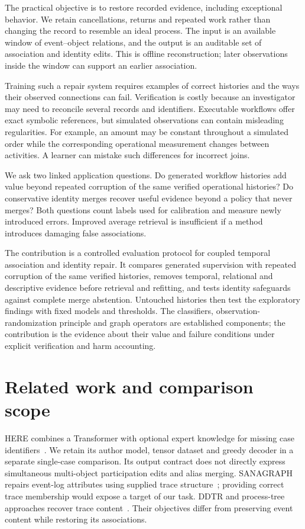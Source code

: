 \documentclass[11pt]{article}
\begin{document}
The practical objective is to restore recorded evidence, including exceptional behavior. We retain cancellations, returns and repeated work rather than changing the record to resemble an ideal process. The input is an available window of event--object relations, and the output is an auditable set of association and identity edits. This is offline reconstruction; later observations inside the window can support an earlier association.

Training such a repair system requires examples of correct histories and the ways their observed connections can fail. Verification is costly because an investigator may need to reconcile several records and identifiers. Executable workflows offer exact symbolic references, but simulated observations can contain misleading regularities. For example, an amount may be constant throughout a simulated order while the corresponding operational measurement changes between activities. A learner can mistake such differences for incorrect joins.

We ask two linked application questions. Do generated workflow histories add value beyond repeated corruption of the same verified operational histories? Do conservative identity merges recover useful evidence beyond a policy that never merges? Both questions count labels used for calibration and measure newly introduced errors. Improved average retrieval is insufficient if a method introduces damaging false associations.

The contribution is a controlled evaluation protocol for coupled temporal association and identity repair. It compares generated supervision with repeated corruption of the same verified histories, removes temporal, relational and descriptive evidence before retrieval and refitting, and tests identity safeguards against complete merge abstention. Untouched histories then test the exploratory findings with fixed models and thresholds. The classifiers, observation-randomization principle and graph operators are established components; the contribution is the evidence about their value and failure conditions under explicit verification and harm accounting.

\section{Related work and comparison scope}
HERE combines a Transformer with optional expert knowledge for missing case identifiers~\cite{here}. We retain its author model, tensor dataset and greedy decoder in a separate single-case comparison. Its output contract does not directly express simultaneous multi-object participation edits and alias merging. SANAGRAPH repairs event-log attributes using supplied trace structure~\cite{sanagraph}; providing correct trace membership would expose a target of our task. DDTR and process-tree approaches recover trace content~\cite{ddtr,processtree}. Their objectives differ from preserving event content while restoring its associations.
\end{document}
